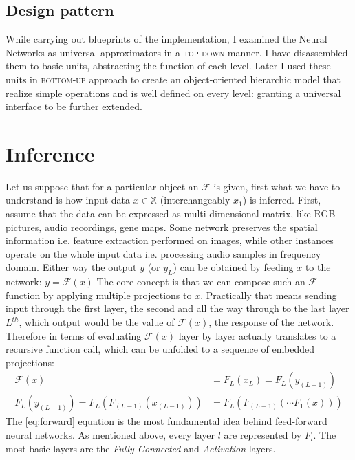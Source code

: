 \subsection{Design pattern} While carrying out blueprints of the implementation, I examined the Neural Networks as universal approximators in a \textsc{top-down} manner.
I have disassembled them to basic units, abstracting the function of each level.
Later I used these units in \textsc{bottom-up} approach to create an object-oriented hierarchic model that realize simple operations and is well defined on every level: granting a universal interface to be further extended.


\section{Inference}
Let us suppose that for a particular object an $\mathcal{F}$ is given, first what we have to understand is how input data 
$x \in \mathbb{X}$ (interchangeably $x_1$) is inferred.
First, assume that the data can be expressed as multi-dimensional matrix, like RGB pictures, audio recordings, gene maps.
Some network preserves the spatial information i.e. feature extraction performed on images, 
while other instances operate on the whole input data i.e. processing audio samples in frequency domain.
Either way the output $y$ (or $y_L$) can be obtained by feeding $x$ to the network: 
$ y = \mathcal{F}(x)$
The core concept is that we can compose such an $\mathcal{F}$ function by applying multiple projections to $x$.
Practically that means sending input through the first layer, the second and all the way through to the last layer $L^{th}$, which output would be the value of $\mathcal{F}(x)$, the response of the network.
Therefore in terms of evaluating $\mathcal{F}(x)$ layer by layer actually translates to a recursive function call, which can be unfolded to a sequence of embedded projections:
\begin{equation}\label{eq:forward}
\begin{split}
    \mathcal{F}(x) &= F_L \left( x_L \right) = F_L \left( y_{(L-1)} \right)\\
    F_L \left( y_{(L-1)} \right) = 
    F_L \left( F_{(L-1)} \left( x_{(L-1)} \right) \right) &= F_L \left( F_{(L-1)}\left( \cdots F_1(x)\right)\right)
\end{split}
\end{equation}
%
The \ref{eq:forward} equation is the most fundamental idea behind feed-forward neural networks.
As mentioned above, every layer $l$ are represented by $F_l$. 
The most basic layers are the \emph{Fully Connected} and \emph{Activation} layers.

